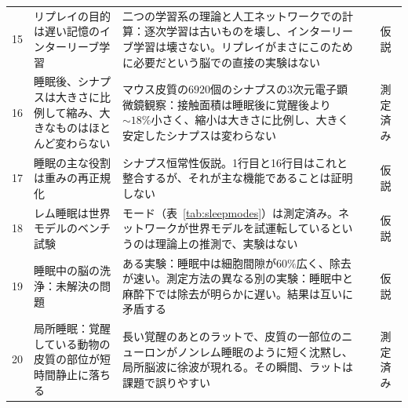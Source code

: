 {\begin{longtable}{>{\raggedright}p{0.5cm}>{\raggedright}p{4.0cm}>{\raggedright}p{5.6cm}>{\raggedright}p{2.3cm}>{\raggedright\arraybackslash}p{1.7cm}}
15 & リプレイの目的は遅い記憶のインターリーブ学習 & 二つの学習系の理論と人工ネットワークでの計算：逐次学習は古いものを壊し、インターリーブ学習は壊さない。リプレイがまさにこのために必要だという脳での直接の実験はない & \cite{McClelland1995} & 仮説 \\
16 & 睡眠後、シナプスは大きさに比例して縮み、大きなものはほとんど変わらない & マウス皮質の$6920$個のシナプスの3次元電子顕微鏡観察：接触面積は睡眠後に覚醒後より$\sim18\%$小さく、縮小は大きさに比例し、大きく安定したシナプスは変わらない & \cite{deVivo2017} & 測定済み \\
17 & 睡眠の主な役割は重みの再正規化 & シナプス恒常性仮説。1行目と16行目はこれと整合するが、それが主な機能であることは証明しない & \cite{TononiCirelli2014} & 仮説 \\
18 & レム睡眠は世界モデルのベンチ試験 & モード（表~\ref{tab:sleepmodes}）は測定済み。ネットワークが世界モデルを試運転しているというのは理論上の推測で、実験はない & \cite{Hobson2009} & 仮説 \\
19 & 睡眠中の脳の洗浄：未解決の問題 & ある実験：睡眠中は細胞間隙が$60\%$広く、除去が速い。測定方法の異なる別の実験：睡眠中と麻酔下では除去が明らかに遅い。結果は互いに矛盾する & \cite{Xie2013,Miao2024} & 仮説 \\
20 & 局所睡眠：覚醒している動物の皮質の部位が短時間静止に落ちる & 長い覚醒のあとのラットで、皮質の一部位のニューロンがノンレム睡眠のように短く沈黙し、局所脳波に徐波が現れる。その瞬間、ラットは課題で誤りやすい & \cite{Vyazovskiy2011} & 測定済み \\
\bottomrule
\end{longtable}}
